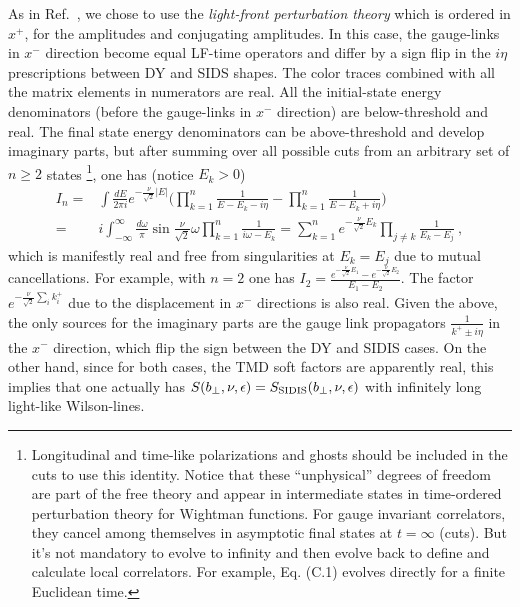 \documentclass[a4paper,11pt]{article}
\begin{document}
As in Ref.~\cite{Collins:2011zzd}, we chose to use the {\it light-front perturbation theory} which is ordered in $x^+$, for the amplitudes and conjugating amplitudes. In this case, the gauge-links in $x^-$ direction become equal LF-time operators and differ by a sign flip in the $i\eta$ prescriptions between DY and SIDS shapes. The color traces combined with all the matrix elements in numerators are real. All the initial-state energy denominators (before the gauge-links in $x^-$ direction) are below-threshold and real. The final state energy denominators can be above-threshold and develop imaginary parts, but after summing over all possible cuts from an arbitrary set of $n\ge 2$ states \footnote{Longitudinal and time-like polarizations and ghosts should be included in the cuts to use this identity. Notice that these ``unphysical'' degrees of freedom are part of the free theory and appear in intermediate states in time-ordered perturbation theory for Wightman functions. For gauge invariant correlators, they cancel among themselves in asymptotic final states at $t =\infty$ (cuts). But it's not mandatory to evolve to infinity and then evolve back to define and calculate local correlators. For example, Eq. (C.1) evolves directly for a finite Euclidean time.}, one has (notice $E_k>0$)
\begin{align}\label{eq:finalsum}
I_n=&\int \frac{dE}{2\pi i}e^{-\frac{\nu}{\sqrt{2}} |E|}\bigg(\prod_{k=1}^n \frac{1}{E-E_k-i\eta}-\prod_{k=1}^n \frac{1}{E-E_k+i\eta}\bigg) \nonumber \\
=&i\int_{-\infty}^{\infty}\frac{d\omega}{\pi}\sin \frac{\nu}{\sqrt{2}}\omega\prod_{k=1}^n \frac{1}{i\omega-E_k}=\sum_{k=1}^ne^{-\frac{\nu}{\sqrt{2}} E_k}\prod_{j\ne k}\frac{1}{E_k-E_j} \ ,
\end{align}
which is manifestly real and free from singularities at $E_k=E_j$ due to mutual cancellations. For example, with $n=2$ one has $I_2=\frac{e^{-\frac{\nu}{\sqrt{2}} E_1}-e^{-\frac{\nu}{\sqrt{2}} E_2}}{E_1-E_2}$. The factor $e^{-\frac{\nu}{\sqrt{2}}\sum_i k_i^+}$ due to the displacement in $x^-$ directions is also real. Given the above, the only sources for the imaginary parts are the gauge link propagators $\frac{1}{k^+\pm i\eta}$ in the $x^-$ direction, which flip the sign between the DY and SIDIS cases. On the other hand, since for both cases, the TMD soft factors are apparently real, this implies that one actually has $S(b_\perp,\nu,\epsilon)=S_{\rm SIDIS}(b_\perp,\nu,\epsilon)$ with infinitely long light-like Wilson-lines.
\end{document}
